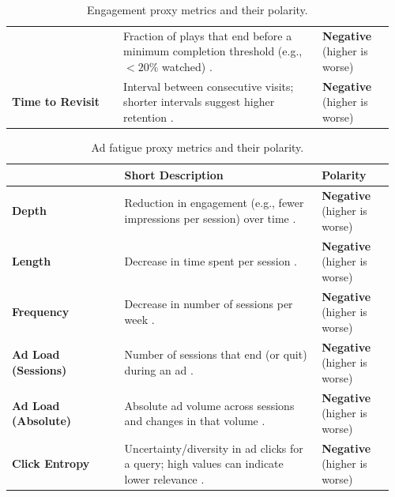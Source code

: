 \documentclass[manuscript,review,screen]{acmart}
\begin{document}
\begin{table}[H]
\begin{tabularx}{\linewidth}{>{\raggedright\arraybackslash}p{0.28\linewidth} >{\raggedright\arraybackslash}p{0.50\linewidth} >{\raggedright\arraybackslash}p{0.18\linewidth}}
    & Fraction of plays that end before a minimum completion threshold (e.g., $<20\%$ watched) \cite{pan2023learning}.
    & \textbf{Negative} (higher is worse) \\
\textbf{Time to Revisit}
    & Interval between consecutive visits; shorter intervals suggest higher retention \cite{wang2022surrogate}.
    & \textbf{Negative} (higher is worse) \\
\bottomrule
\end{tabularx}
\caption{Engagement proxy metrics and their polarity.}
\label{tab:proxy-metrics-engagement}
\end{table}

\begin{table}[H]
\centering
\footnotesize
\renewcommand{\arraystretch}{1.15}
\setlength{\tabcolsep}{4pt}
\begin{tabularx}{\linewidth}{>{\raggedright\arraybackslash}p{0.29\linewidth} >{\raggedright\arraybackslash}p{0.49\linewidth} >{\raggedright\arraybackslash}p{0.18\linewidth}}
\toprule
{\bfseries Proxy Metric} & {\bfseries Short Description} & {\bfseries Polarity} \\
\midrule
\textbf{Depth}
    & Reduction in engagement (e.g., fewer impressions per session) over time \cite{sagtani2023quantifying}.
    & \textbf{Negative} (higher is worse) \\
\textbf{Length}
    & Decrease in time spent per session \cite{sagtani2023quantifying}.
    & \textbf{Negative} (higher is worse) \\
\textbf{Frequency}
    & Decrease in number of sessions per week \cite{sagtani2023quantifying}.
    & \textbf{Negative} (higher is worse) \\
\textbf{Ad Load (Sessions)}
    & Number of sessions that end (or quit) during an ad \cite{sagtani2023quantifying}.
    & \textbf{Negative} (higher is worse) \\
\textbf{Ad Load (Absolute)}
    & Absolute ad volume across sessions and changes in that volume \cite{sagtani2023quantifying}.
    & \textbf{Negative} (higher is worse) \\
\textbf{Click Entropy}
    & Uncertainty/diversity in ad clicks for a query; high values can indicate lower relevance \cite{sagtani2023quantifying}.
    & \textbf{Negative} (higher is worse) \\
\bottomrule
\end{tabularx}
\caption{Ad fatigue proxy metrics and their polarity.}
\label{tab:proxy-metrics-fatigue}
\end{table}
\vspace{-1em}
\end{document}
